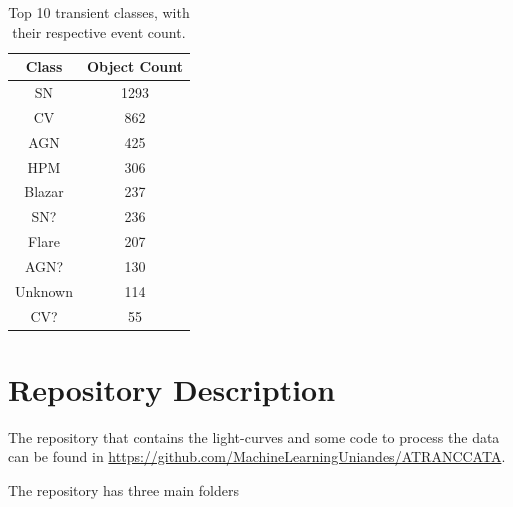 \documentclass[a4paper,fleqn,usenatbib]{mnras}
\begin{document}
\begin{table}
\centering
\begin{tabular}{c|c}
    \hline
    Class &  Object Count \\
    \hline
    SN & 1293 \\
    CV & 862 \\
    AGN & 425 \\
    HPM & 306 \\
    Blazar & 237 \\
    SN? & 236 \\
    Flare & 207 \\
    AGN? & 130 \\
    Unknown & 114 \\
    CV? & 55 \\
    \hline
\end{tabular}
\caption{Top 10 transient classes, with their respective event count.}
\label{Top-Transient-Classes}
\end{table}

\section{Repository Description} \label{section_code}

The repository that contains the light-curves and some code to process
the data can be found in
\url{https://github.com/MachineLearningUniandes/ATRANCCATA}. 

The repository has three main folders
\end{document}
